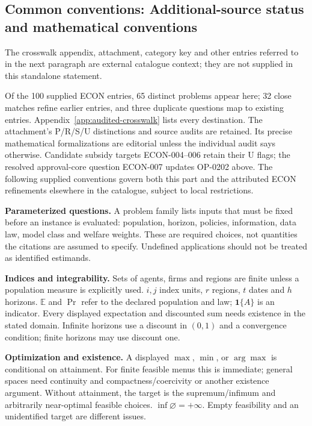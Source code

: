 \documentclass[11pt,a4paper]{article}
\begin{document}
\subsection*{Common conventions: Additional-source status and mathematical conventions}

\label{audited:conventions}

The crosswalk appendix, attachment, category key and other entries referred to in the next paragraph are external catalogue context; they are not supplied in this standalone statement.

Of the 100 supplied ECON entries, 65 distinct problems appear here; 32 close
matches refine earlier entries, and three duplicate questions map to existing
entries. Appendix~\ref{app:audited-crosswalk} lists every destination.
The attachment's P/R/S/U distinctions and source audits are retained. Its
precise mathematical formalizations are editorial unless the individual audit
says otherwise. Candidate subsidy targets ECON-004--006 retain their U flags;
the resolved approval-core question ECON-007 updates OP-0202 above.
The following supplied conventions govern both this part and the attributed
ECON refinements elsewhere in the catalogue, subject to local restrictions.

\textbf{Parameterized questions.} A problem family lists inputs that must be fixed before an instance is evaluated: population, horizon, policies, information, data law, model class and welfare weights. These are required choices, not quantities the citations are assumed to specify. Undefined applications should not be treated as identified estimands.

\textbf{Indices and integrability.} Sets of agents, firms and regions are finite unless a population measure is explicitly used. \(i,j\) index units, \(r\) regions, \(t\) dates and \(h\) horizons. \(\mathbb E\) and \(\Pr\) refer to the declared population and law; \(\mathbf1\{A\}\) is an indicator. Every displayed expectation and discounted sum needs existence in the stated domain. Infinite horizons use a discount in \((0,1)\) and a convergence condition; finite horizons may use discount one.

\textbf{Optimization and existence.} A displayed \(\max\), \(\min\), or \(\arg\max\) is conditional on attainment. For finite feasible menus this is immediate; general spaces need continuity and compactness/coercivity or another existence argument. Without attainment, the target is the supremum/infimum and arbitrarily near-optimal feasible choices. \(\inf\varnothing=+\infty\). Empty feasibility and an unidentified target are different issues.
\end{document}
